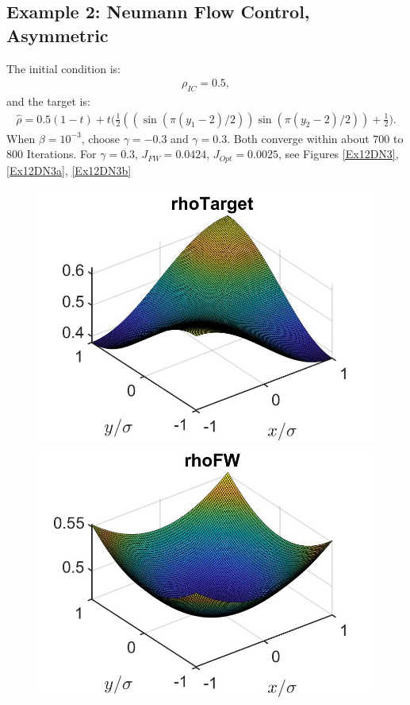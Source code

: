 \documentclass[11pt, a4paper]{article}
\theoremstyle{definition}
\begin{document}
\subsection{Example 2: Neumann Flow Control, Asymmetric}
The initial condition is:
\begin{align*}
\rho_{IC} = 0.5,
\end{align*}
and the target is:
\begin{align*}
\hat \rho = 0.5(1-t) + t\bigg(\frac{1}{2}((\sin(\pi (y_1 - 2)/2))\sin(\pi(y_2 - 2)/2)) + \frac{1}{2}\bigg).
\end{align*}
When $\beta = 10^{-3}$, choose $\gamma = -0.3$ and $\gamma = 0.3$. Both converge within about $700$ to $800$ Iterations.
For $\gamma = 0.3$, $J_{FW} = 0.0424$, $J_{Opt} = 0.0025$, see Figures \ref{Ex12DN3}, \ref{Ex12DN3a}, \ref{Ex12DN3b}
\begin{figure}[h]
	\includegraphics[scale=0.3]{rhoHat2DN3.jpg}
	\includegraphics[scale=0.3]{rhoFW2DN3.jpg}

\end{figure}
\end{document}
